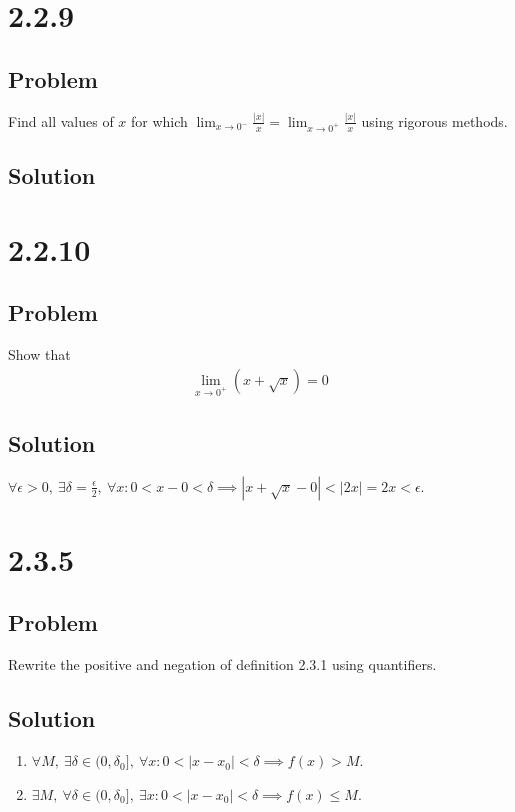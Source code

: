 \documentclass[12pt]{article}
\newcommand{\round}[1]{\left(       #1 \right)      }
\newcommand{\abs}  [1]{\left|       #1 \right|      }
\begin{document}
\section*{2.2.9}

\subsection*{Problem}
Find all values of $x$ for which $\lim_{x \to 0^-} \frac{\abs{x}}{x} = \lim_{x \to 0^+} \frac{\abs{x}}{x}$ using rigorous methods.

\subsection*{Solution}




\section*{2.2.10}

\subsection*{Problem}
Show that
\begin{align*}
    \lim_{x \to 0^+} \round{x + \sqrt{x}} = 0
\end{align*}

\subsection*{Solution}
$\forall \epsilon > 0,\ \exists \delta = \frac{\epsilon}{2},\ \forall x : 0 < x - 0 < \delta \implies \abs{x + \sqrt{x} - 0} < \abs{2x} = 2x < \epsilon$.

\section*{2.3.5}

\subsection*{Problem}
Rewrite the positive and negation of definition 2.3.1 using quantifiers.

\subsection*{Solution}
\begin{enumerate}
    \item $\forall M,\ \exists \delta \in (0, \delta_0],\ \forall x : 0 < \abs{x - x_0} < \delta \implies f(x) > M$.
    \item $\exists M,\ \forall \delta \in (0, \delta_0],\ \exists x : 0 < \abs{x - x_0} < \delta \implies f(x) \leq M$.
\end{enumerate}
\end{document}

